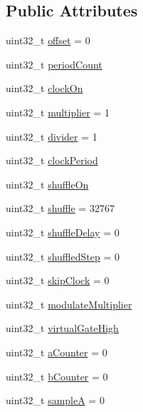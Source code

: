 \subsection*{Public Attributes}
\begin{DoxyCompactItemize}
\item 
uint32\+\_\+t \mbox{\hyperlink{class_dual_euclidean_a2dddcba8d52c9deba965c7751866c85f}{offset}} = 0
\item 
uint32\+\_\+t \mbox{\hyperlink{class_dual_euclidean_a64fd4a846ef9448e45ed252f0c272b59}{period\+Count}}
\item 
uint32\+\_\+t \mbox{\hyperlink{class_dual_euclidean_ad11fa3c6d1303467ebffae617dda5cc8}{clock\+On}}
\item 
uint32\+\_\+t \mbox{\hyperlink{class_dual_euclidean_a7ef5ab9221f00262bf015f7a67663f3e}{multiplier}} = 1
\item 
uint32\+\_\+t \mbox{\hyperlink{class_dual_euclidean_a9f1e0d3ea0d236c36c9ec259b4af6320}{divider}} = 1
\item 
uint32\+\_\+t \mbox{\hyperlink{class_dual_euclidean_a358adc877f7d9c9baa67928d75a667d2}{clock\+Period}}
\item 
uint32\+\_\+t \mbox{\hyperlink{class_dual_euclidean_a10b8d6a00cc86bde18bd612619138724}{shuffle\+On}}
\item 
uint32\+\_\+t \mbox{\hyperlink{class_dual_euclidean_a19521a4f42d79dcf5c88c02acb8fcc30}{shuffle}} = 32767
\item 
uint32\+\_\+t \mbox{\hyperlink{class_dual_euclidean_a3573c1d5e5484ebfccfad19b17aa5113}{shuffle\+Delay}} = 0
\item 
uint32\+\_\+t \mbox{\hyperlink{class_dual_euclidean_ab17ea18eb5504cffd255fbd926d3f41d}{shuffled\+Step}} = 0
\item 
uint32\+\_\+t \mbox{\hyperlink{class_dual_euclidean_a0cee123dd1067d2144f9c3c53e1d4707}{skip\+Clock}} = 0
\item 
uint32\+\_\+t \mbox{\hyperlink{class_dual_euclidean_aad2c789fc10f9bb42e36ade714cf8e32}{modulate\+Multiplier}}
\item 
uint32\+\_\+t \mbox{\hyperlink{class_dual_euclidean_a178d24471a08efe6149529d86b05fa1d}{virtual\+Gate\+High}}
\item 
uint32\+\_\+t \mbox{\hyperlink{class_dual_euclidean_acf4499de05acdc7547c5acb21219ef4d}{a\+Counter}} = 0
\item 
uint32\+\_\+t \mbox{\hyperlink{class_dual_euclidean_a5313528458ec30301e147c1ea7908d25}{b\+Counter}} = 0
\item 
uint32\+\_\+t \mbox{\hyperlink{class_dual_euclidean_a80ac40990fb9804313428fc88bb25a00}{sampleA}} = 0

\end{DoxyCompactItemize}
